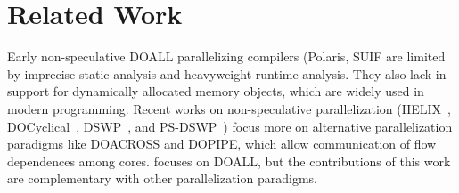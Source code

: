 \section{Related Work}






Early non-speculative DOALL parallelizing compilers
(Polaris\cite{blume:94:polaris},
SUIF\cite{amarasinghe:93:pldi,suif:94:stanford} are limited by imprecise
static analysis and heavyweight runtime analysis. They also lack in
support for dynamically allocated memory objects, which are widely used in
modern programming. Recent works on non-speculative parallelization
(HELIX~\cite{simone:12:cgo}, DOCyclical~\cite{yu2016cyclical},
DSWP~\cite{ottoni:05:micro}, and PS-DSWP~\cite{raman:08a:cgo}) focus more
on alternative parallelization paradigms like DOACROSS and DOPIPE, which
allow communication of flow dependences among cores. \name focuses on DOALL, 
but the contributions of this work are complementary with other
parallelization paradigms.

